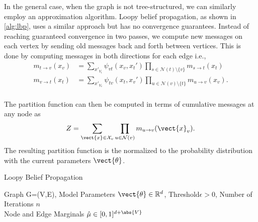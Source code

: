 

In the general case, when the graph is not tree-structured, we can similarly employ an approximation algorithm. 
Loopy belief propagation, as shown in \autoref{alg:lbp}, uses a similar approach but has no convergence guarantees.
Instead of reaching guaranteed convergence in two passes, we compute new messages on each vertex by sending old messages back and forth between vertices.
This is done by computing messages in both directions for each edge i.e., 
\begin{equation}
    \begin{split}
        \label{eq:mespas}
        m_{t \rightarrow v}(x_v) &= \sum_{x'_{V_t}} \psi_{vt}(x_v, x_t') \prod_{s\in \mathcal{N}(t) \setminus \{v\}} m_{s \rightarrow t}(x_t) \\
        m_{v \rightarrow t}(x_t) &= \sum_{x'_{V_v}} \psi_{tv}(x_t, x_v') \prod_{u\in \mathcal{N}(v) \setminus \{t\}} m_{u \rightarrow v}(x_v). \\
    \end{split}
\end{equation}

The partition function can then be computed in terms of cumulative messages\cite{piatkowski2018exponential} at any node as 
\begin{equation}
    Z = \sum_{\vect{x} \in \mathcal{X}_v} \prod_{u \in \mathcal{N}(v)} m_{u \rightarrow v}(\vect{x}_v).
\end{equation} 
The resulting partition function is the normalized to the probability distribution with the current parameters $\vect{\theta}$.

\begin{algo}{Loopy Belief Propagation}
    \begin{algorithm}[H]
        \caption{Loopy Belief Propagation}
        \begin{algorithmic}
            \label{alg:lbp}
            \REQUIRE Graph G=(V,E), Model Parameters $\vect{\theta} \in \mathbb{R}^d$, Threshold$\epsilon > 0$, Number of Iterations $n$\\
            \ENSURE  Node and Edge Marginals $\hat{\mu} \in [0,1]^{d + \abs{V}}$ \\
                \\
                \ENDFOR
                \\
                \\
                \ENDIF
            \ENDFOR
        \end{algorithmic}
    \end{algorithm}
\end{algo}
